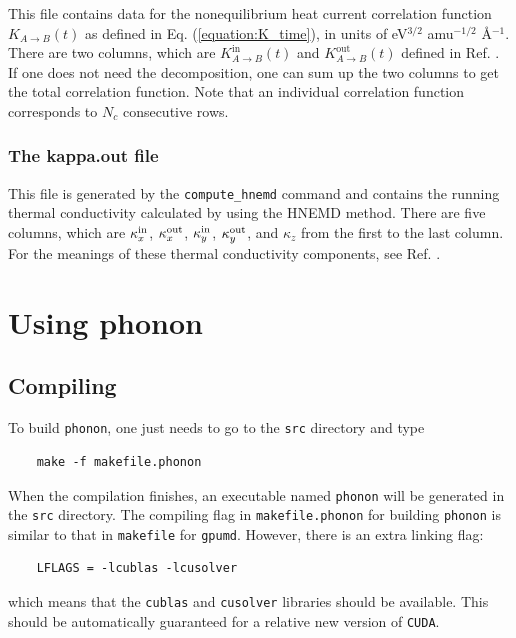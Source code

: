\documentclass[12pt,a4paper]{report}
\begin{document}
This file contains data for the nonequilibrium heat current correlation function $K_{A \rightarrow B}(t)$ as defined in Eq. (\ref{equation:K_time}), in units of eV$^{3/2}$ amu$^{-1/2}$ \AA$^{-1}$. There are two columns, which are $K_{A \rightarrow B}^{\text{in}}(t)$ and $K_{A \rightarrow B}^{\text{out}}(t)$ defined in Ref. \cite{fan2017prb}. If one does not need the decomposition, one can sum up the two columns to get the total correlation function. Note that an individual correlation function corresponds to $N_c$ consecutive rows.


\subsection{The kappa.out file}

This file is generated by the \verb"compute_hnemd" command and contains the running thermal conductivity calculated by using the HNEMD method. There are five columns, which are $\kappa^{\rm in}_x$, $\kappa^{\rm out}_x$, $\kappa^{\rm in}_y$, $\kappa^{\rm out}_y$, and $\kappa_z$ from the first to the last column. For the meanings of these thermal conductivity components, see Ref. \cite{fan2018submitted,xu2018msmse,dong2018pccp}.


\chapter{Using phonon}

\section{Compiling}

To build \verb"phonon", one just needs to go to the \verb"src" directory and type 
\begin{verbatim}
    make -f makefile.phonon
\end{verbatim}
When the compilation finishes, an executable named \verb"phonon" will be generated in the \verb"src" directory. The compiling flag in \verb"makefile.phonon" for building \verb"phonon" is similar to that in \verb"makefile" for \verb"gpumd". However, there is an extra linking flag:
\begin{verbatim}
    LFLAGS = -lcublas -lcusolver
\end{verbatim}
which means that the \verb"cublas" and \verb"cusolver" libraries should be available. This should be automatically guaranteed for a relative new version of \verb"CUDA".
\end{document}
